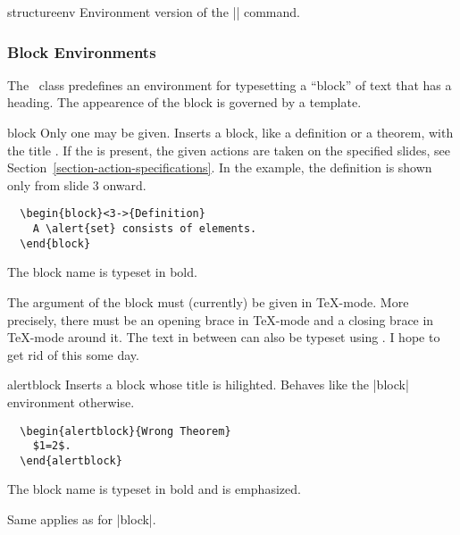 \begin{environment}{{structureenv}}
  Environment version of the |\structure| command.
\end{environment}




\subsubsection{Block Environments}
\label{predefined}

The \beamer\ class predefines an environment for typesetting a
``block'' of text that has a heading. The appearence of the block is
governed by a template.

\begin{environment}{{block}}
  Only one  may be given.
  Inserts a block, like a definition or a theorem, with the title
  . If the  is present,
  the given actions are taken on the specified slides, see
  Section~\ref{section-action-specifications}. In the example, the 
  definition is shown only from slide 3 onward.
  \example
\begin{verbatim}
  \begin{block}<3->{Definition}
    A \alert{set} consists of elements.
  \end{block}
\end{verbatim}

  \articlenote
  The block name is typeset in bold.

  \lyxnote
  The argument of the block must (currently) be given in
  \TeX-mode. More precisely, there must be an opening brace in
  \TeX-mode and a closing brace in \TeX-mode around it. The text
  in between can also be typeset using \LyX. I hope to get rid of this
  some day.
\end{environment}


\begin{environment}{{alertblock}} 
  Inserts a block whose title is hilighted. Behaves like the |block|
  environment otherwise.
  \example
\begin{verbatim}
  \begin{alertblock}{Wrong Theorem}
    $1=2$.
  \end{alertblock}
\end{verbatim}

  \articlenote
  The block name is typeset in bold and is emphasized.

  \lyxnote
  Same applies as for |block|.
\end{environment}

